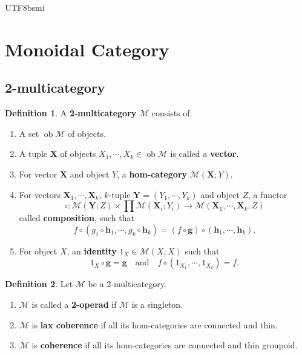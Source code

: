 \documentclass[12pt]{article}
\theoremstyle{definition}
\newtheorem{definition}{Definition}[section]
\newcommand\<{\langle}
\renewcommand\>{\rangle}
\DeclareMathOperator{\ob}{ob}
\begin{document}
\begin{CJK}{UTF8}{bsmi}
\section{Monoidal Category}

\subsection{2-multicategory}

\begin{definition}
    A \textbf{2-multicategory} $\mathcal{M}$ consists of:
    \begin{enumerate}
        \item A set $\ob\mathcal{M}$ of objects.
        \item[] A tuple $\textbf{X}$ of objects $X_1, \cdots, X_k\in\ob\mathcal{M}$ is called a \textbf{vector}.
        \item For vector $\textbf{X}$ and object $Y$, a \textbf{hom-category} $\mathcal{M}(\textbf{X}; Y)$.
        \item For vectors $\textbf{X}_1, \cdots, \textbf{X}_k$, $k$-tuple $\textbf{Y}=(Y_1, \cdots, Y_k)$ and object $Z$, a functor
        \[
            \circ: \mathcal{M}(\textbf{Y}; Z)\times\prod\mathcal{M}(\textbf{X}_i; Y_i)\to\mathcal{M}(\textbf{X}_1, \cdots, \textbf{X}_k; Z)
        \]
        called \textbf{composition}, such that
        \[
            f\circ(g_1\circ\textbf{h}_1, \cdots, g_k\circ\textbf{h}_k)
            = (f\circ\textbf{g})\circ(\textbf{h}_1, \cdots, \textbf{h}_k).
        \]
        \item For object $X$, an \textbf{identity} $1_X\in\mathcal{M}(X; X)$ such that
        \[
            1_X\circ\textbf{g} = \textbf{g} 
            \quad\text{and}\quad
            f\circ(1_{X_1}, \cdots, 1_{X_k}) = f.
        \]
    \end{enumerate}
\end{definition}

\begin{definition}
    Let $\mathcal{M}$ be a 2-multicategory.
    \begin{enumerate}
        \item $\mathcal{M}$ is called a \textbf{2-operad} if $\mathcal{M}$ is a singleton.
        \item $\mathcal{M}$ is \textbf{lax coherence} if all its hom-categories are connected and thin.
        \item $\mathcal{M}$ is \textbf{coherence} if all its hom-categories are connected and thin groupoid.
    \end{enumerate}
\end{definition}


\end{CJK}
\end{document}
